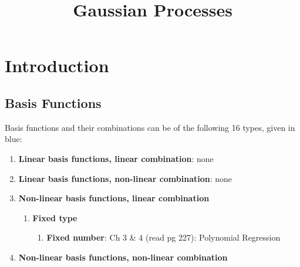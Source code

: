 \documentclass{article}
\title{Gaussian Processes}
\begin{document}
\maketitle

\section{Introduction}

\subsection{Basis Functions}
Basis functions and their combinations can be of the following 16 types, given in blue:
\begin{enumerate}
\item {\color{red}\textbf{Linear basis functions, linear combination}}: none
\item {\color{red}\textbf{Linear basis functions, non-linear combination}}: none
\item {\color{red}\textbf{Non-linear basis functions, linear combination}}
\begin{enumerate}
\item {\color{OliveGreen}\textbf{Fixed type}}
\begin{enumerate}
\item {\color{blue}\textbf{Fixed number}}: Ch 3 \& 4 (read pg 227): Polynomial Regression
\end{enumerate}
\end{enumerate}
\item {\color{red}\textbf{Non-linear basis functions, non-linear combination}}
\end{enumerate}

\cite{GaussProc_SimpleIntro}
\cite{BOOK_GMPL}

\printbibliography
\end{document}
